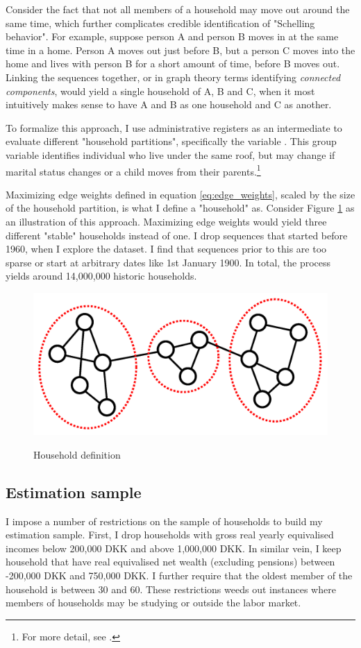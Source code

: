 \documentclass[main.tex]{subfiles}
\begin{document}
Consider the fact that not all members of a household may move out around the same time, which further complicates credible identification of "Schelling behavior". For example, suppose person A and person B moves in at the same time in a home. Person A moves out just before B, but a person C moves into the home and lives with person B for a short amount of time, before B moves out. Linking the sequences together, or in graph theory terms identifying \textit{connected components}, would yield a single household of A, B and C, when it most intuitively makes sense to have A and B as one household and C as another. 

To formalize this approach, I use administrative registers as an intermediate to evaluate different "household partitions", specifically the variable . This group variable identifies individual who live under the same roof, but may change if marital status changes or a child moves from their parents.\footnote{For more detail, see \textcite{dst_familie_id}.} 

Maximizing edge weights defined in equation \ref{eq:edge_weights}, scaled by the size of the household partition, is what I define a "household" as. Consider Figure \ref{fig:temporal_community_detection} as an illustration of this approach. Maximizing edge weights would yield three different "stable" households instead of one. I drop sequences that started before 1960, when I explore the  dataset. I find that sequences prior to this are too sparse or start at arbitrary dates like 1st January 1900. In total, the process yields around 14,000,000 historic households. 
\begin{figure}[H]
    \centering
    \caption{Household definition}
    \includegraphics[width=0.7\linewidth]{figs/temporal_community_detection.png}
    \label{fig:temporal_community_detection}
\end{figure}



\subsection{Estimation sample}
\label{sec:estimation_sample_definition}
I impose a number of restrictions on the sample of households to build my estimation sample. First, I drop households with gross real yearly equivalised incomes below 200,000 DKK and above 1,000,000 DKK. In similar vein, I keep household that have real equivalised net wealth (excluding pensions) between -200,000 DKK and 750,000 DKK. I further require that the oldest member of the household is between 30 and 60. These restrictions weeds out instances where members of households may be studying or outside the labor market.  
\end{document}
